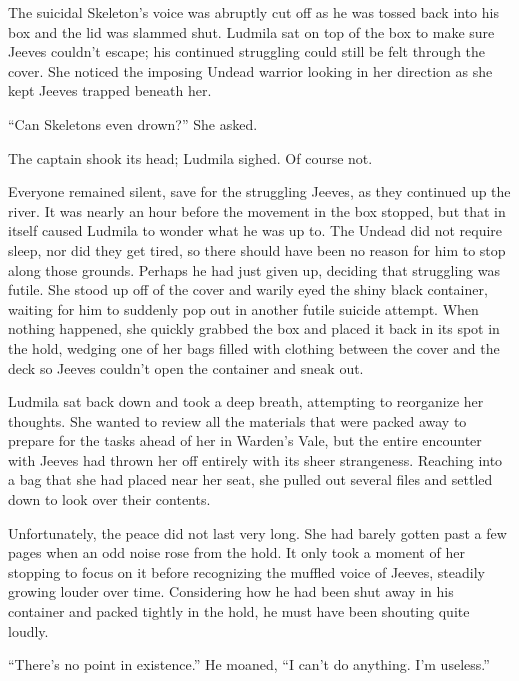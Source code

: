 The suicidal Skeleton’s voice was abruptly cut off as he was tossed back into his box and the lid was slammed shut. Ludmila sat on top of the box to make sure Jeeves couldn’t escape; his continued struggling could still be felt through the cover. She noticed the imposing Undead warrior looking in her direction as she kept Jeeves trapped beneath her.

 

“Can Skeletons even drown?” She asked.

 

The captain shook its head; Ludmila sighed. Of course not.

 

Everyone remained silent, save for the struggling Jeeves, as they continued up the river. It was nearly an hour before the movement in the box stopped, but that in itself caused Ludmila to wonder what he was up to. The Undead did not require sleep, nor did they get tired, so there should have been no reason for him to stop along those grounds. Perhaps he had just given up, deciding that struggling was futile. She stood up off of the cover and warily eyed the shiny black container, waiting for him to suddenly pop out in another futile suicide attempt. When nothing happened, she quickly grabbed the box and placed it back in its spot in the hold, wedging one of her bags filled with clothing between the cover and the deck so Jeeves couldn’t open the container and sneak out.

 

Ludmila sat back down and took a deep breath, attempting to reorganize her thoughts. She wanted to review all the materials that were packed away to prepare for the tasks ahead of her in Warden’s Vale, but the entire encounter with Jeeves had thrown her off entirely with its sheer strangeness. Reaching into a bag that she had placed near her seat, she pulled out several files and settled down to look over their contents.

 

Unfortunately, the peace did not last very long. She had barely gotten past a few pages when an odd noise rose from the hold. It only took a moment of her stopping to focus on it before recognizing the muffled voice of Jeeves, steadily growing louder over time. Considering how he had been shut away in his container and packed tightly in the hold, he must have been shouting quite loudly.

 

“There’s no point in existence.” He moaned, “I can’t do anything. I’m useless.”

